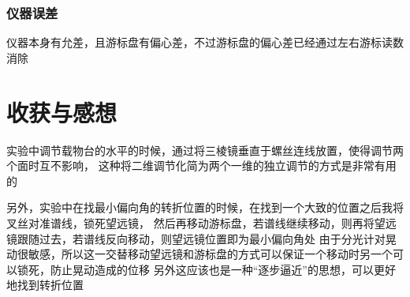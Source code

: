 \documentclass{article}
\begin{document}
    \subsubsection{仪器误差}
    仪器本身有允差，且游标盘有偏心差，不过游标盘的偏心差已经通过左右游标读数消除

    \section{收获与感想}
    实验中调节载物台的水平的时候，通过将三棱镜垂直于螺丝连线放置，使得调节两个面时互不影响，
    这种将二维调节化简为两个一维的独立调节的方式是非常有用的

    另外，实验中在找最小偏向角的转折位置的时候，在找到一个大致的位置之后我将叉丝对准谱线，锁死望远镜，
    然后再移动游标盘，若谱线继续移动，则再将望远镜跟随过去，若谱线反向移动，则望远镜位置即为最小偏向角处
    由于分光计对晃动很敏感，所以这一交替移动望远镜和游标盘的方式可以保证一个移动时另一个可以锁死，防止晃动造成的位移
    另外这应该也是一种“逐步逼近”的思想，可以更好地找到转折位置
\end{document}
